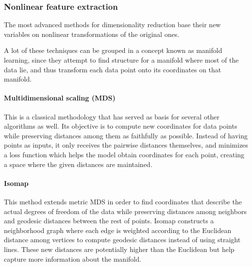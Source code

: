 
\subsubsection{Nonlinear feature extraction}

The most advanced methods for dimensionality reduction base their new variables on nonlinear transformations of the original ones.

A lot of these techniques can be grouped in a concept known as manifold learning, since they attempt to find structure for a manifold where most of the data lie, and thus transform each data point onto its coordinates on that manifold.

\paragraph*{Multidimensional scaling (MDS) }
This is a classical methodology that has served as basis for several other algorithms as well. Its objective is to compute new coordinates for data points while preserving distances among them as faithfully as possible. Instead of having points as inputs, it only receives the pairwise distances themselves, and minimizes a loss function which helps the model obtain coordinates for each point, creating a space where the given distances are maintained. %


\paragraph*{Isomap } This method extends metric MDS in order to find coordinates that describe the actual degrees of freedom of the data while preserving distances among neighbors and geodesic distances between the rest of points. %
Isomap constructs a neighborhood graph where each edge is weighted according to the Euclidean distance among vertices to compute geodesic distances instead of using straight lines. These new distances are potentially higher than the Euclidean but help capture more information about the manifold.

